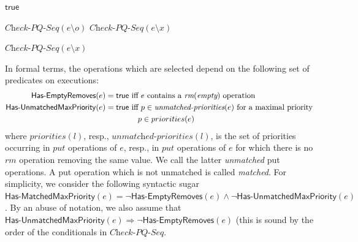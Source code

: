 \begin{algorithm}[t]

{\Return $\mathsf{true}$\;}

{
    {
        \KwRet $\textit{Check-PQ-Seq}(e \setminus o)$\;
    }
}
{
    {
        \KwRet $\textit{Check-PQ-Seq}(e \setminus x)$\;
    }
}

\Else
{
    {
        \KwRet $\textit{Check-PQ-Seq}(e \setminus x)$\;
    }
}
\caption{$\textit{Check-PQ-Seq}$}
\label{alg:seq_check}
\end{algorithm}


In formal terms, the operations which are selected depend on the following set of predicates on executions:
{\small
\begin{align*}
\mathsf{Has\text{-}EmptyRemoves}(e)=\mathsf{true} & \mbox{ iff  $e$ contains a $\textit{rm}(\textit{empty})$ operation} \\
\mathsf{Has\text{-}UnmatchedMaxPriority}(e)=\mathsf{true} & \mbox{ iff $p\in \textit{unmatched-priorities}(e)$ for a maximal priority} \\
&\hspace{4mm}\mbox{$p\in priorities(e)$}
\end{align*}}
where $\textit{priorities}(l)$, resp., $\textit{unmatched-priorities}(l)$, is the set of priorities occurring in $\textit{put}$ operations of $e$, resp., in $\textit{put}$ operations of $e$ for which there is no $\textit{rm}$ operation removing the same value. We call the latter \emph{unmatched} put operations. A put operation which is not unmatched is called \emph{matched}. For simplicity, we consider the following syntactic sugar $\mathsf{Has\text{-}MatchedMaxPriority}(e)=\neg \mathsf{Has\text{-}EmptyRemoves}(e)\land \neg \mathsf{Has\text{-}UnmatchedMaxPriority}(e)$. By an abuse of notation, we also assume that  $\mathsf{Has\text{-}UnmatchedMaxPriority}(e) \Rightarrow \neg \mathsf{Has\text{-}EmptyRemoves}(e)$ (this is sound by the order of the conditionals in $\textit{Check-PQ-Seq}$.

